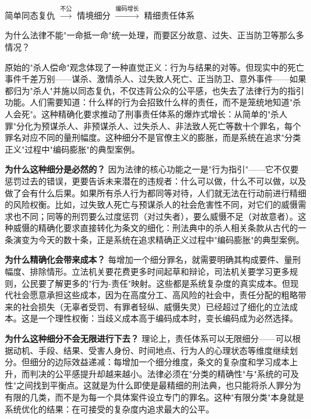 \documentclass[../main.tex]{subfiles}
\begin{document}
	\begin{logicmap}

		简单同态复仇 $\xrightarrow{\text{不公}}$ 情境细分 $\xrightarrow{\text{编码增长}}$ 精细责任体系

	\end{logicmap}
	
	\begin{questionbox}

		为什么法律不能"一命抵一命"统一处理，而要区分故意、过失、正当防卫等那么多情况？

	\end{questionbox}
	
	原始的"杀人偿命"观念体现了一种直觉正义：行为与结果的对等。但现实中的死亡事件千差万别——谋杀、激情杀人、过失致人死亡、正当防卫、意外事件——如果都归为"杀人"并施以同态复仇，不仅违背公众的公平感，也失去了法律行为的指引功能。人们需要知道：什么样的行为会招致什么样的责任，而不是笼统地知道"杀人会死"。这种精确化要求推动了刑事责任体系的爆炸式增长：从简单的"杀人罪"分化为预谋杀人、非预谋杀人、过失杀人、非法致人死亡等数十个罪名，每个罪名对应不同的量刑幅度。这种细分不是官僚主义的膨胀，而是系统在追求"分类正义"过程中"编码膨胀"的典型案例。
	
	\textbf{为什么这种细分是必然的？} 因为法律的核心功能之一是"行为指引"——它不仅要惩罚过去的错误，更要告诉未来潜在的违规者：什么可以做，什么不可以做，以及做了会有什么后果。如果所有杀人行为都同等对待，人们就无法在行动前进行精细的风险权衡。比如，过失致人死亡与预谋杀人的社会危害性不同，对它们的威慑需求也不同；同等的刑罚要么过度惩罚（对过失者），要么威慑不足（对故意者）。这种威慑的精确化要求直接转化为条文的细化：刑法典中的杀人相关条款从古代的一条演变为今天的数十条，正是系统在追求精确正义过程中"编码膨胀"的典型案例。
	
	\textbf{为什么精确化会带来成本？} 每增加一个细分罪名，就需要明确其构成要件、量刑幅度、排除情形。立法机关要花费更多时间起草和辩论，司法机关要学习更多规则，公民要了解更多的"行为-责任"映射。这些都是系统复杂度的真实成本。但现代社会愿意承担这些成本，因为在高度分工、高风险的社会中，责任分配的粗略带来的社会损失（无辜者受罚、有罪者轻纵、威慑失灵）已经超过了细化的立法成本。这是一个理性权衡：当歧义成本高于编码成本时，变长编码成为必然选择。
	
	\textbf{为什么这种细分不会无限进行下去？} 理论上，责任体系可以无限细分——可以根据动机、手段、结果、受害人身份、时间地点、行为人的心理状态等维度继续划分。但细分的边际效益递减：每增加一个细分维度，条文的复杂度和学习成本上升，而判决的公平感提升却越来越小。法律必须在"分类的精确性"与"系统的可及性"之间找到平衡点。这就是为什么即使是最精细的刑法典，也只能将杀人罪分为有限的几类，而不是为每一个具体案件设立专门的罪名。这种"有限分类"本身就是系统优化的结果：在可接受的复杂度内追求最大的公平。
	
\end{document}
